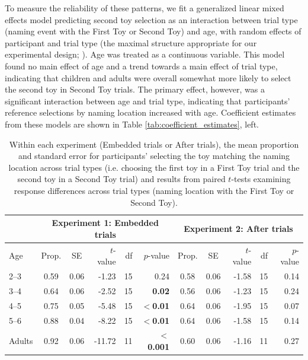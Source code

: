 \documentclass[man]{apa2}
\begin{document}
To measure the reliability of these patterns, we fit a generalized linear mixed effects model predicting second toy selection as an interaction between trial type (naming event with the First Toy or Second Toy) and age, with random effects of participant and trial type (the maximal structure appropriate for our experimental design; ). Age was treated as a continuous variable. This model found no main effect of age and a trend towards a main effect of trial type, indicating that children and adults were overall somewhat more likely to select the second toy in Second Toy trials. The primary effect, however, was a significant interaction between age and trial type, indicating that participants' reference selections by naming location increased with age. Coefficient estimates from these models are shown in Table \ref{tab:coefficient_estimates}, left.



   \begin{table} [t]
   \caption{Within each experiment (Embedded trials or After trials), the mean proportion and standard error for participants' selecting the toy matching the naming location across trial types (i.e. choosing the first toy in a First Toy trial and the second toy in a Second Toy trial) and results from paired $t$-tests examining response differences across trial types (naming location with the First Toy or Second Toy). \label{tab:2} } 
   \begin{center} 
     \begin{tabular}{lccrrr|ccrrr} 
          & \multicolumn{5}{c}{Experiment 1: Embedded trials} &  \multicolumn{5}{c}{Experiment 2: After trials}\\
                      \hline 
       \null Age & Prop. & SE & $t$-value & df & $p$-value  & Prop. & SE & $t$-value & df & $p$-value  \\ 
       \hline  
        2--3  & 0.59 & 0.06 & -1.23 & 15 & 0.24 & 0.58 & 0.06 & -1.58 & 15& 0.14\\ 
        3--4  & 0.64 & 0.06 & -2.52 & 15 & \textbf{0.02} & 0.56 & 0.06 & -1.23 & 15 & 0.24 \\ 
        4--5  & 0.75 & 0.05 & -5.48 & 15 & \textbf{$<$0.01} & 0.64 & 0.06 &-1.95 & 15 & 0.07\\
        5--6  & 0.88 & 0.04 & -8.22 & 15 & \textbf{$<$0.01} & 0.64 & 0.06  & -1.58 & 15 & 0.14\\ 
        Adults & 0.92 & 0.06 & -11.72 & 11 & \textbf{$<$0.001} & 0.60 & 0.06 & -1.16 & 11 & 0.27 \\
       \hline 
     \end{tabular} 
  \end{center}
 \end{table}
 
\end{document}
